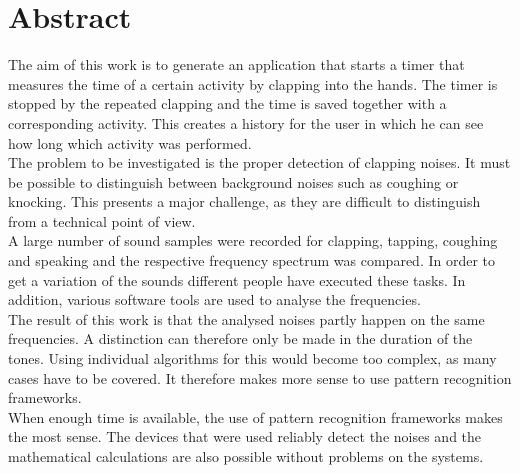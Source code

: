 \chapter*{Abstract}
The aim of this work is to generate an application that starts a timer that measures the time of a certain activity by clapping into the hands. The timer is stopped by the repeated clapping and the time is saved together with a corresponding activity. This creates a history for the user in which he can see how long which activity was performed.
\\
The problem to be investigated is the proper detection of clapping noises. It must be possible to distinguish between background noises such as coughing or knocking. This presents a major challenge, as they are difficult to distinguish from a technical point of view.
\\
A large number of sound samples were recorded for clapping, tapping, coughing and speaking and the respective frequency spectrum was compared. In order to get a variation of the sounds different people have executed these tasks. In addition, various software tools are used to analyse the frequencies.
\\
The result of this work is that the analysed noises partly happen on the same frequencies. %
A distinction can therefore only be made in the duration of the tones. Using individual algorithms for this would become too complex, as many cases have to be covered. It therefore makes more sense to use pattern recognition frameworks. %
\\
When enough time is available, the use of pattern recognition frameworks makes the most sense. The devices that were used reliably detect the noises and the mathematical calculations are also possible without problems on the systems.